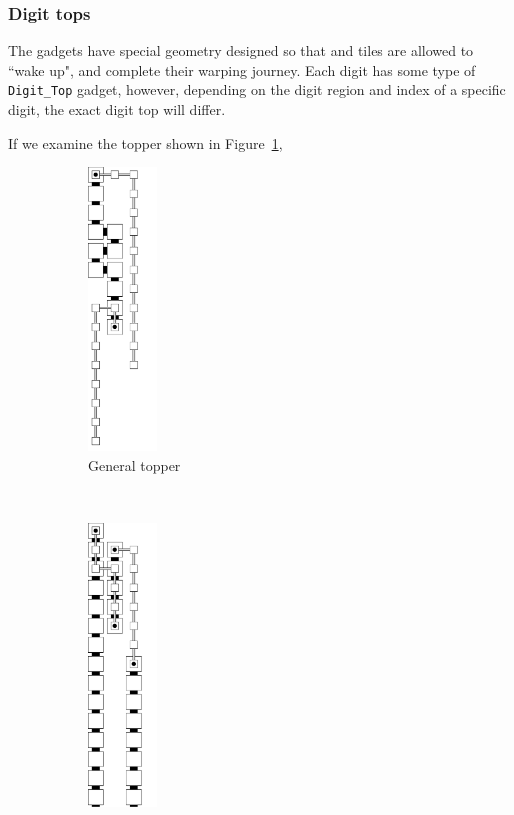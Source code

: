 \subsubsection{Digit tops}
The {\dtop} gadgets have special geometry designed so that {\firstwarp} and
{\secondwarp} tiles are allowed to ``wake up", and complete their warping journey. Each
digit has some type of {\tt Digit\_Top} gadget, however, depending on the digit region
and index of a specific digit, the exact digit top will differ.

If we examine the topper shown in Figure~\ref{fig:topper_gen},
\vspace{.5cm}


\begin{figure}[H]
    \centering
    \begin{subfigure}[t]{0.2\textwidth}
        \centering
        \includegraphics[width=0.2\textwidth]{digit_tops/digit_top_general_topper}
        \caption{\label{fig:topper_gen} General topper}
    \end{subfigure}%
    ~
    \begin{subfigure}[t]{0.2\textwidth}
        \centering
        \includegraphics[width=0.2\textwidth]{digit_tops/digit_top_case1_digit1_topper}

\end{subfigure}
\end{figure}
